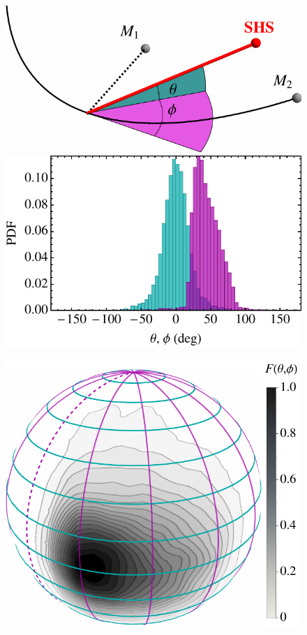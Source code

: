 \documentclass[a4paper,twocolumn]{emulateapj}
\begin{document}
{\begin{figure}
\centering
\begin{minipage}[b]{0.45\linewidth}
\centering
\includegraphics[width=0.8\linewidth,clip=true]{angles-diagram}\\
\includegraphics[width=0.8\linewidth,clip=true]{angles-hist}
\end{minipage}
\begin{minipage}[b]{0.45\linewidth}
\centering
\includegraphics[width=\linewidth,clip=true]{angles-2d}

\end{minipage}
\end{figure}}
\end{document}
